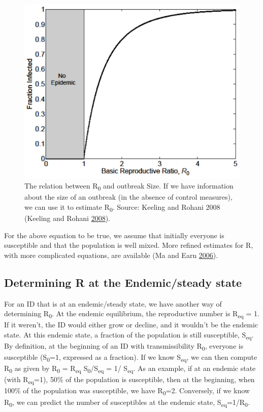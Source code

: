 \documentclass[]{book}
\theoremstyle{definition}
\theoremstyle{definition}
\theoremstyle{definition}
\theoremstyle{remark}
\begin{document}
\begin{figure}
\centering
\includegraphics{./images/outbreaksize.png}
\caption{\label{fig:outbreaksize}The relation between R\textsubscript{0} and
outbreak Size. If we have information about the size of an outbreak (in
the absence of control measures), we can use it to estimate
R\textsubscript{0}. Source: Keeling and Rohani 2008 (Keeling and Rohani
\protect\hyperlink{ref-keeling08}{2008}).}
\end{figure}

For the above equation to be true, we assume that initially everyone is
susceptible and that the population is well mixed. More refined
estimates for R, with more complicated equations, are available (Ma and
Earn \protect\hyperlink{ref-ma06}{2006}).

\subsection{Determining R at the Endemic/steady
state}\label{determining-r-at-the-endemicsteady-state}

For an ID that is at an endemic/steady state, we have another way of
determining R\textsubscript{0}. At the endemic equilibrium, the
reproductive number is R\textsubscript{eq} = 1. If it weren't, the ID
would either grow or decline, and it wouldn't be the endemic state. At
this endemic state, a fraction of the population is still susceptible,
S\textsubscript{eq}. By definition, at the beginning of an ID with
transmissibility R\textsubscript{0}, everyone is susceptible
(S\textsubscript{0}=1, expressed as a fraction). If we know
S\textsubscript{eq}, we can then compute R\textsubscript{0} as given by
R\textsubscript{0} = R\textsubscript{eq}
S\textsubscript{0}/S\textsubscript{eq} = 1/ S\textsubscript{eq}. As an
example, if at an endemic state (with R\textsubscript{eq}=1), 50\% of
the population is susceptible, then at the beginning, when 100\% of the
population was susceptible, we have R\textsubscript{0}=2. Conversely, if
we know R\textsubscript{0}, we can predict the number of susceptibles at
the endemic state, S\textsubscript{eq}=1/R\textsubscript{0}.
\end{document}
